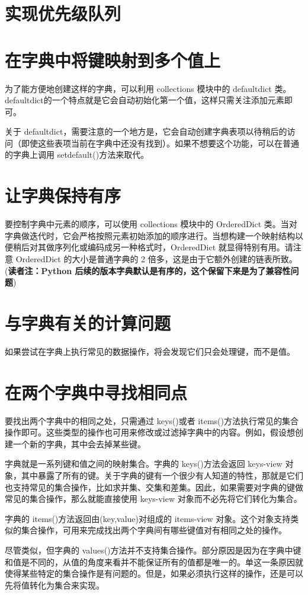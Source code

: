 \section{实现优先级队列}
\section{在字典中将键映射到多个值上}
为了能方便地创建这样的字典，可以利用 collections 模块中的 defaultdict 类。defaultdict的一个特点就是它会自动初始化第一个值，这样只需关注添加元素即可。

关于 defaultdict，需要注意的一个地方是，它会自动创建字典表项以待稍后的访问（即使这些表项当前在字典中还没有找到）。如果不想要这个功能，可以在普通的字典上调用 setdefault()方法来取代。
\section{让字典保持有序}
要控制字典中元素的顺序，可以使用 collections 模块中的 OrderedDict 类。当对字典做迭代时，它会严格按照元素初始添加的顺序进行。当想构建一个映射结构以便稍后对其做序列化或编码成另一种格式时，OrderedDict 就显得特别有用。请注意 OrderedDict 的大小是普通字典的 2 倍多，这是由于它额外创建的链表所致。(\textbf{读者注：Python 后续的版本字典默认是有序的，这个保留下来是为了兼容性问题})
\section{与字典有关的计算问题}
如果尝试在字典上执行常见的数据操作，将会发现它们只会处理键，而不是值。
\section{在两个字典中寻找相同点}
要找出两个字典中的相同之处，只需通过 keys()或者 items()方法执行常见的集合操作即可。这些类型的操作也可用来修改或过滤掉字典中的内容。例如，假设想创建一个新的字典，其中会去掉某些键。

字典就是一系列键和值之间的映射集合。字典的 keys()方法会返回 keys-view 对象，其中暴露了所有的键。关于字典的键有一个很少有人知道的特性，那就是它们也支持常见的集合操作，比如求并集、交集和差集。因此，如果需要对字典的键做常见的集合操作，那么就能直接使用 keys-view 对象而不必先将它们转化为集合。

字典的 items()方法返回由(key,value)对组成的 items-view 对象。这个对象支持类似的集合操作，可用来完成找出两个字典间有哪些键值对有相同之处的操作。

尽管类似，但字典的 values()方法并不支持集合操作。部分原因是因为在字典中键和值是不同的，从值的角度来看并不能保证所有的值都是唯一的。单这一条原因就使得某些特定的集合操作是有问题的。但是，如果必须执行这样的操作，还是可以先将值转化为集合来实现。